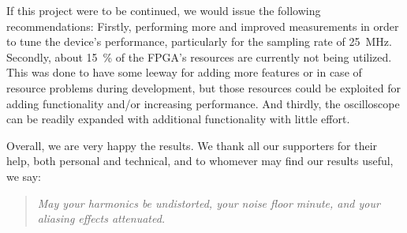 If  this  project  were  to  be   continued,  we  would  issue  the  following
recommendations: Firstly, performing  more and improved measurements  in order
to  tune the  device's  performance,  particularly for  the  sampling rate  of
\SI{25}{\MHz}.  Secondly, about \SI{15}{\percent}  of the FPGA's resources are
currently not  being utilized.  This was  done to have some  leeway for adding
more features  or in case of  resource problems during development,  but those
resources  could  be  exploited  for adding  functionality  and/or  increasing
performance. And  thirdly,  the  oscilloscope  can be  readily  expanded  with
additional functionality with little effort.

Overall, we are very happy the  results. We thank all our supporters for their
help,  both personal  and  technical, and  to whomever  may  find our  results
useful, we say:
\begin{quote}
\centering
\emph{%
    May  your harmonics  be undistorted,  your  noise floor  minute, and  your
    aliasing effects attenuated.%
}
\end{quote}
